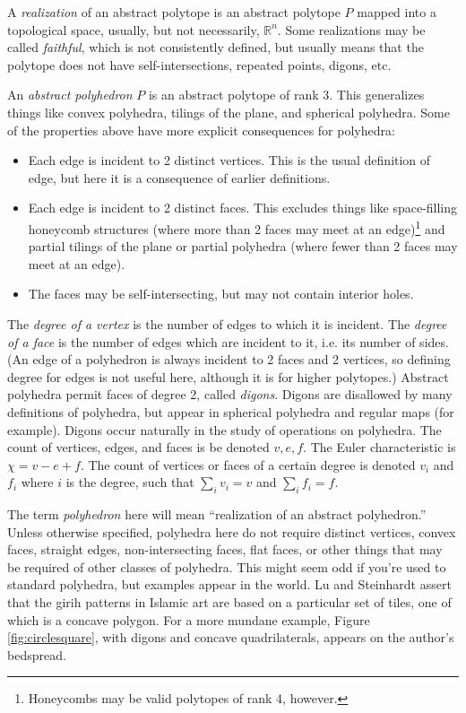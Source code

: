 \documentclass{amsart}[12pt]
\begin{document}
A \textit{realization} of an abstract polytope is an abstract polytope $P$
mapped into a topological space, usually, but not necessarily, $\mathbb{R}^n$.
Some realizations may be called \textit{faithful}, which is not consistently
defined, but usually means that the polytope does not have self-intersections,
repeated points, digons, etc.

An \textit{abstract polyhedron} $P$ is an abstract polytope of rank 3. This
generalizes things like convex polyhedra, tilings of the plane,
and spherical polyhedra. Some of the properties above have more
explicit consequences for polyhedra: \cite{grunbaum03}
\begin{itemize}
  \item Each edge is incident to 2 distinct vertices. This is the usual
  definition of edge, but here it is a consequence of earlier definitions.
  \item Each edge is incident to 2 distinct faces. This excludes things like
  space-filling honeycomb structures (where more than 2 faces may meet at an
  edge)\footnote{Honeycombs may be valid polytopes of rank 4, however.} and
  partial tilings of the plane or partial polyhedra (where fewer than 2 faces may meet at an edge).
  \item The faces may be self-intersecting, but may not contain interior holes.
\end{itemize}
The \textit{degree of a vertex} is the number of edges to which it is incident.
The \textit{degree of a face} is the number of edges which are incident to it,
i.e. its number of sides. (An edge of a polyhedron is always incident to 2
faces and 2 vertices, so defining degree for edges is not useful here, although
it is for higher polytopes.)
Abstract polyhedra permit faces of degree 2, called \textit{digons}. Digons are
disallowed by many definitions of polyhedra, but appear in spherical polyhedra
and regular maps (for example). Digons occur naturally in the study of
operations on polyhedra. The count of vertices, edges, and faces is be denoted
$v, e, f$. The Euler characteristic is $\chi = v - e + f$. The count of
vertices or faces of a certain degree is denoted $v_i$ and $f_i$ where $i$ is
the degree, such that $\sum_i v_i = v$ and $\sum_i f_i = f$.

The term \textit{polyhedron} here will mean ``realization of an abstract
polyhedron.'' Unless otherwise specified, polyhedra here do not require
distinct vertices, convex faces, straight edges, non-intersecting faces, flat
faces, or other things that may be required of other classes of polyhedra. This
might seem odd if you're used to standard polyhedra, but examples appear in the
world. Lu and Steinhardt \cite{lu07} assert that the girih patterns in Islamic
art are based on a particular set of tiles, one of which is a concave polygon.
For a more mundane example, Figure \ref{fig:circlesquare}, with digons and
concave quadrilaterals, appears on the author's bedspread.
\end{document}
